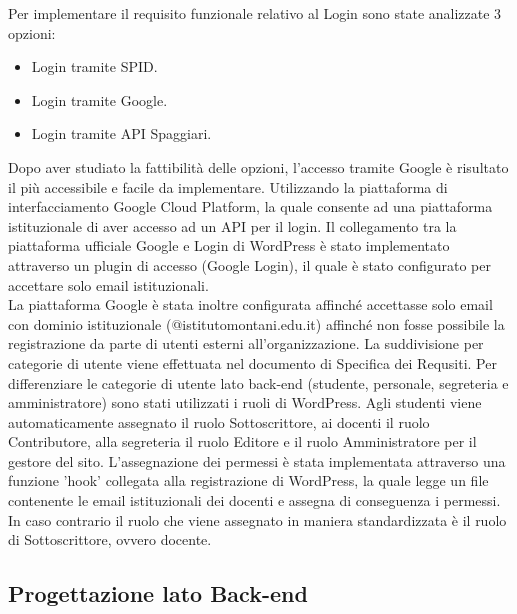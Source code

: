 \documentclass{article}
\begin{document}
	Per implementare il requisito funzionale relativo al Login sono state analizzate 3 opzioni:
	\begin{itemize}
	    \item Login tramite SPID.
	    \item Login tramite Google.
	    \item Login tramite API Spaggiari.
	\end{itemize}
	Dopo aver studiato la fattibilità delle opzioni, l'accesso tramite Google è risultato il più accessibile e facile da implementare. Utilizzando la piattaforma di interfacciamento Google Cloud Platform, la quale consente ad una piattaforma istituzionale di aver accesso ad un API per il login. Il collegamento tra la piattaforma ufficiale Google e Login di WordPress è stato implementato attraverso un plugin di accesso (Google Login), il quale è stato configurato per accettare solo email istituzionali.\\
	La piattaforma Google è stata inoltre configurata affinché accettasse solo email con dominio istituzionale (@istitutomontani.edu.it) affinché non fosse possibile la registrazione da parte di utenti esterni all'organizzazione.
	La suddivisione per categorie di utente viene effettuata nel documento di Specifica dei Requsiti.
	Per differenziare le categorie di utente lato back-end (studente, personale, segreteria e amministratore) sono stati utilizzati i ruoli di WordPress. Agli studenti viene automaticamente assegnato il ruolo Sottoscrittore, ai docenti il ruolo Contributore, alla segreteria il ruolo Editore e il ruolo Amministratore per il gestore del sito. L'assegnazione dei permessi è stata implementata attraverso una funzione 'hook' collegata alla registrazione di WordPress, la quale legge un file contenente le email istituzionali dei docenti e assegna di conseguenza i permessi.\\ In caso contrario il ruolo che viene assegnato in maniera standardizzata è il ruolo di Sottoscrittore, ovvero docente.   
	
	\clearpage
	
	\subsection{\textbf{Progettazione lato Back-end}}
\end{document}

